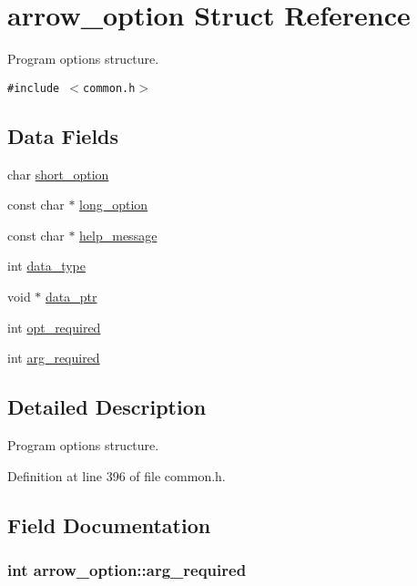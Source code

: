 \hypertarget{structarrow__option}{
\section{arrow\_\-option Struct Reference}
\label{structarrow__option}
}
Program options structure.  


{\tt \#include $<$common.h$>$}

\subsection*{Data Fields}
\begin{CompactItemize}
\item 
char \hyperlink{structarrow__option_f47f3010fcddb84f4a67920db03d7233}{short\_\-option}
\item 
const char $\ast$ \hyperlink{structarrow__option_3d8ddc7b0d627a15c7108e21a16cb51a}{long\_\-option}
\item 
const char $\ast$ \hyperlink{structarrow__option_48bfe5bda71cd04d92067b203ffb92ce}{help\_\-message}
\item 
int \hyperlink{structarrow__option_c97df040be0b7c76e92556087be21ff8}{data\_\-type}
\item 
void $\ast$ \hyperlink{structarrow__option_0b4e8cc50fdb7d8fbb1e63db30cd172d}{data\_\-ptr}
\item 
int \hyperlink{structarrow__option_2e7290d4b7088eab30df5f3bfc34ce93}{opt\_\-required}
\item 
int \hyperlink{structarrow__option_59aa495c8bd2e4d57014e4d9278020ed}{arg\_\-required}
\end{CompactItemize}


\subsection{Detailed Description}
Program options structure. 

Definition at line 396 of file common.h.

\subsection{Field Documentation}
\hypertarget{structarrow__option_59aa495c8bd2e4d57014e4d9278020ed}{
\subsubsection[{arg\_\-required}]{\setlength{\rightskip}{0pt plus 5cm}int {\bf arrow\_\-option::arg\_\-required}}}
\label{structarrow__option_59aa495c8bd2e4d57014e4d9278020ed}


